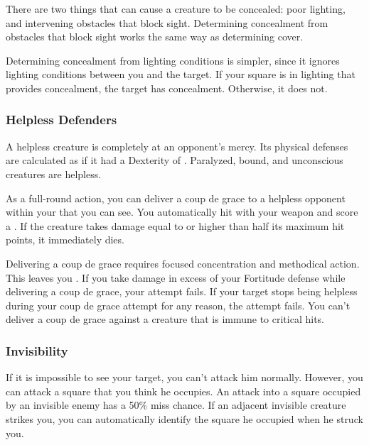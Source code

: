              There are two things that can cause a creature to be concealed: poor lighting, and intervening obstacles that block sight.
            Determining concealment from obstacles that block sight works the same way as determining cover.

            Determining concealment from lighting conditions is simpler, since it ignores lighting conditions between you and the target.
            If your  square is in lighting that provides concealment, the target has concealment.
            Otherwise, it does not.

        \subsubsection{Helpless Defenders}
            A helpless creature is completely at an opponent's mercy.
            Its physical defenses are calculated as if it had a Dexterity of .
            Paralyzed, bound, and unconscious creatures are helpless.

            \label{Coup de Grace} As a full-round action, you can deliver a coup de grace to a helpless opponent within your  that you can see.
            You automatically hit with your weapon and score a . If the creature takes damage equal to or higher than half its maximum hit points, it immediately dies.

            Delivering a coup de grace requires focused concentration and methodical action. This leaves you . If you take damage in excess of your Fortitude defense while delivering a coup de grace, your attempt fails.
            If your target stops being helpless during your coup de grace attempt for any reason, the attempt fails.
            You can't deliver a coup de grace against a creature that is immune to critical hits.

        \subsubsection{Invisibility}\label{Invisibility}
            If it is impossible to see your target, you can't attack him normally. However, you can attack a square that you think he occupies. An attack into a square occupied by an invisible enemy has a 50\% miss chance. If an adjacent invisible creature strikes you, you can automatically identify the square he occupied when he struck you.

